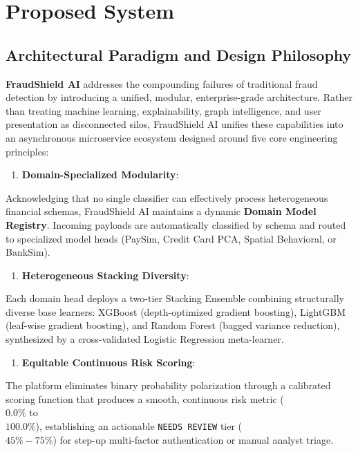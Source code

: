 \documentclass[12pt,a4paper,oneside]{report}
\begin{document}
\section{Proposed System}

\subsection{Architectural Paradigm and Design Philosophy}

\textbf{FraudShield AI} addresses the compounding failures of traditional fraud detection by introducing a unified, modular, enterprise-grade architecture. Rather than treating machine learning, explainability, graph intelligence, and user presentation as disconnected silos, FraudShield AI unifies these capabilities into an asynchronous microservice ecosystem designed around five core engineering principles:


\begin{enumerate}[leftmargin=0.35in]
\item \textbf{Domain-Specialized Modularity}:
\end{enumerate}
Acknowledging that no single classifier can effectively process heterogeneous financial schemas, FraudShield AI maintains a dynamic \textbf{Domain Model Registry}. Incoming payloads are automatically classified by schema and routed to specialized model heads (PaySim, Credit Card PCA, Spatial Behavioral, or BankSim).

\begin{enumerate}[leftmargin=0.35in]
\item \textbf{Heterogeneous Stacking Diversity}:
\end{enumerate}
Each domain head deploys a two-tier Stacking Ensemble combining structurally diverse base learners: XGBoost (depth-optimized gradient boosting), LightGBM (leaf-wise gradient boosting), and Random Forest (bagged variance reduction), synthesized by a cross-validated Logistic Regression meta-learner.

\begin{enumerate}[leftmargin=0.35in]
\item \textbf{Equitable Continuous Risk Scoring}:
\end{enumerate}
The platform eliminates binary probability polarization through a calibrated scoring function that produces a smooth, continuous risk metric (\\$0.0\%$ to \\$100.0\%$), establishing an actionable \texttt{NEEDS REVIEW} tier (\\$45\%-75\%$) for step-up multi-factor authentication or manual analyst triage.
\end{document}
